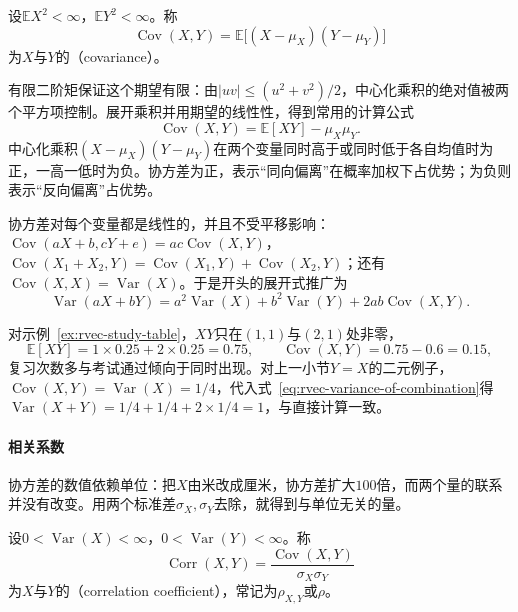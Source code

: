 \begin{definition}[协方差]
设$\mathbb EX^2<\infty$，$\mathbb EY^2<\infty$。称
\[
 \operatorname{Cov}(X,Y)=\mathbb E\bigl[(X-\mu_X)(Y-\mu_Y)\bigr]
\]
为$X$与$Y$的（covariance）。
\end{definition}

有限二阶矩保证这个期望有限：由$|uv|\le(u^2+v^2)/2$，中心化乘积的绝对值被两个平方项控制。展开乘积并用期望的线性性，得到常用的计算公式
\[
 \operatorname{Cov}(X,Y)=\mathbb E[XY]-\mu_X\mu_Y .
\]
中心化乘积$(X-\mu_X)(Y-\mu_Y)$在两个变量同时高于或同时低于各自均值时为正，一高一低时为负。协方差为正，表示“同向偏离”在概率加权下占优势；为负则表示“反向偏离”占优势。

协方差对每个变量都是线性的，并且不受平移影响：$\operatorname{Cov}(aX+b,cY+e)=ac\operatorname{Cov}(X,Y)$，$\operatorname{Cov}(X_1+X_2,Y)=\operatorname{Cov}(X_1,Y)+\operatorname{Cov}(X_2,Y)$；还有$\operatorname{Cov}(X,X)=\operatorname{Var}(X)$。于是开头的展开式推广为
\begin{equation}
 \operatorname{Var}(aX+bY)=a^2\operatorname{Var}(X)+b^2\operatorname{Var}(Y)+2ab\operatorname{Cov}(X,Y).
 \label{eq:rvec-variance-of-combination}
\end{equation}

\begin{example}[概率表中的协方差]
\label{ex:rvec-table-covariance}
对示例~\ref{ex:rvec-study-table}，$XY$只在$(1,1)$与$(2,1)$处非零，
\[
 \mathbb E[XY]=1\times0.25+2\times0.25=0.75,\qquad
 \operatorname{Cov}(X,Y)=0.75-0.6=0.15,
\]
复习次数多与考试通过倾向于同时出现。对上一小节$Y=X$的二元例子，$\operatorname{Cov}(X,Y)=\operatorname{Var}(X)=1/4$，代入式~\eqref{eq:rvec-variance-of-combination}得$\operatorname{Var}(X+Y)=1/4+1/4+2\times1/4=1$，与直接计算一致。
\end{example}

\paragraph{相关系数}
协方差的数值依赖单位：把$X$由米改成厘米，协方差扩大$100$倍，而两个量的联系并没有改变。用两个标准差$\sigma_X,\sigma_Y$去除，就得到与单位无关的量。

\begin{definition}[相关系数]
设$0<\operatorname{Var}(X)<\infty$，$0<\operatorname{Var}(Y)<\infty$。称
\[
 \operatorname{Corr}(X,Y)=\frac{\operatorname{Cov}(X,Y)}{\sigma_X\sigma_Y}
\]
为$X$与$Y$的（correlation coefficient），常记为$\rho_{X,Y}$或$\rho$。
\end{definition}

